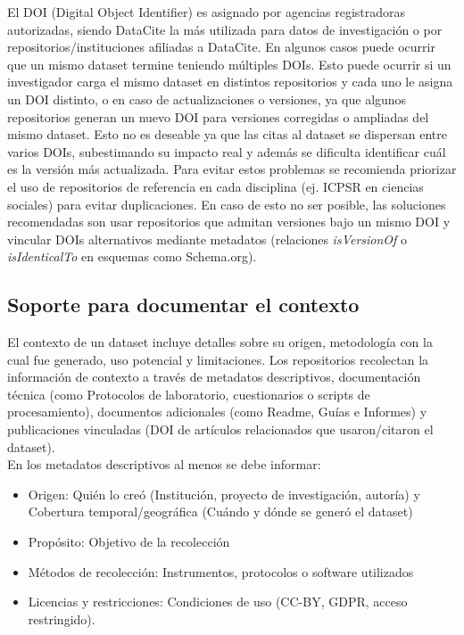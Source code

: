 \documentclass[runningheads]{llncs}
\begin{document}
El DOI (Digital Object Identifier) es asignado por agencias registradoras autorizadas, siendo DataCite la más utilizada para datos de investigación o por repositorios/instituciones afiliadas a DataCite. En algunos casos puede ocurrir que un mismo dataset termine teniendo múltiples DOIs. Esto puede ocurrir si un investigador carga el mismo dataset en distintos repositorios y cada uno le asigna un DOI distinto, o en caso de actualizaciones o versiones, ya que algunos repositorios generan un nuevo DOI para versiones corregidas o ampliadas del mismo dataset. Esto no es deseable ya que las citas al dataset se dispersan entre varios DOIs, subestimando su impacto real y además se dificulta identificar cuál es la versión más actualizada. Para evitar estos problemas se recomienda priorizar el uso de repositorios de referencia en cada disciplina (ej. ICPSR en ciencias sociales) para evitar duplicaciones. En caso de esto no ser posible, las soluciones recomendadas son usar repositorios que admitan versiones bajo un mismo DOI y vincular DOIs alternativos mediante metadatos (relaciones \emph{isVersionOf} o \emph{isIdenticalTo} en esquemas como Schema.org). 

\subsection*{Soporte para documentar el contexto}

El contexto de un dataset incluye detalles sobre su origen, metodología con la cual fue generado, uso potencial y limitaciones. Los repositorios recolectan la información de contexto a través de metadatos descriptivos, documentación técnica (como Protocolos de laboratorio, cuestionarios o scripts de procesamiento), documentos adicionales (como Readme, Guías e Informes) y publicaciones vinculadas (DOI de artículos relacionados que usaron/citaron el dataset). \\


En los metadatos descriptivos al menos se debe informar:  
\begin{itemize}
\item Origen: Quién lo creó (Institución, proyecto de investigación, autoría) y Cobertura temporal/geográfica (Cuándo y dónde se generó el dataset) 
\item Propósito: Objetivo de la recolección 
\item Métodos de recolección: Instrumentos, protocolos o software utilizados 
\item Licencias y restricciones: Condiciones de uso (CC-BY, GDPR, acceso restringido).
\end{itemize}
\end{document}
